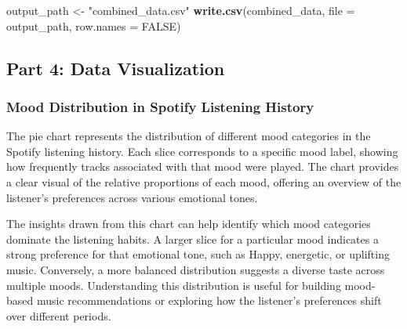\documentclass[
]{article}
\newenvironment{Shaded}{\begin{snugshade}}{\end{snugshade}}
\newcommand{\AttributeTok}[1]{\textcolor[rgb]{0.13,0.29,0.53}{#1}}
\newcommand{\ConstantTok}[1]{\textcolor[rgb]{0.56,0.35,0.01}{#1}}
\newcommand{\FunctionTok}[1]{\textcolor[rgb]{0.13,0.29,0.53}{\textbf{#1}}}
\newcommand{\NormalTok}[1]{#1}
\newcommand{\OtherTok}[1]{\textcolor[rgb]{0.56,0.35,0.01}{#1}}
\newcommand{\StringTok}[1]{\textcolor[rgb]{0.31,0.60,0.02}{#1}}
\begin{document}
\begin{Shaded}
\begin{Highlighting}[]
\NormalTok{output\_path }\OtherTok{\textless{}{-}} \StringTok{"combined\_data.csv"}
\FunctionTok{write.csv}\NormalTok{(combined\_data, }\AttributeTok{file =}\NormalTok{ output\_path, }\AttributeTok{row.names =} \ConstantTok{FALSE}\NormalTok{)}
\end{Highlighting}
\end{Shaded}

\subsection{Part 4: Data Visualization}\label{part-4-data-visualization}

\subsubsection{Mood Distribution in Spotify Listening
History}\label{mood-distribution-in-spotify-listening-history}

The pie chart represents the distribution of different mood categories
in the Spotify listening history. Each slice corresponds to a specific
mood label, showing how frequently tracks associated with that mood were
played. The chart provides a clear visual of the relative proportions of
each mood, offering an overview of the listener's preferences across
various emotional tones.

The insights drawn from this chart can help identify which mood
categories dominate the listening habits. A larger slice for a
particular mood indicates a strong preference for that emotional tone,
such as Happy, energetic, or uplifting music. Conversely, a more
balanced distribution suggests a diverse taste across multiple moods.
Understanding this distribution is useful for building mood-based music
recommendations or exploring how the listener's preferences shift over
different periods.
\end{document}
